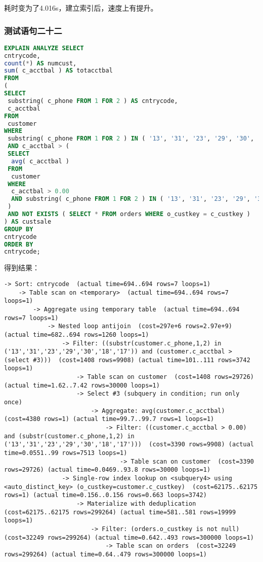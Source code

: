 \documentclass{article}
\begin{document}
耗时变为了4.016s，建立索引后，速度上有提升。

\subsubsection{测试语句二十二}

\begin{lstlisting}[language=sql]
EXPLAIN ANALYZE SELECT
cntrycode,
count(*) AS numcust,
sum( c_acctbal ) AS totacctbal 
FROM
(
SELECT
 substring( c_phone FROM 1 FOR 2 ) AS cntrycode,
 c_acctbal 
FROM
 customer 
WHERE
 substring( c_phone FROM 1 FOR 2 ) IN ( '13', '31', '23', '29', '30', '18', '17' ) 
 AND c_acctbal > (
 SELECT
  avg( c_acctbal ) 
 FROM
  customer 
 WHERE
  c_acctbal > 0.00 
  AND substring( c_phone FROM 1 FOR 2 ) IN ( '13', '31', '23', '29', '30', '18', '17' ) 
 ) 
 AND NOT EXISTS ( SELECT * FROM orders WHERE o_custkey = c_custkey ) 
) AS custsale 
GROUP BY
cntrycode 
ORDER BY
cntrycode;
\end{lstlisting}

得到结果：

\begin{lstlisting}
-> Sort: cntrycode  (actual time=694..694 rows=7 loops=1)
    -> Table scan on <temporary>  (actual time=694..694 rows=7 loops=1)
        -> Aggregate using temporary table  (actual time=694..694 rows=7 loops=1)
            -> Nested loop antijoin  (cost=297e+6 rows=2.97e+9) (actual time=682..694 rows=1260 loops=1)
                -> Filter: ((substr(customer.c_phone,1,2) in ('13','31','23','29','30','18','17')) and (customer.c_acctbal > (select #3)))  (cost=1408 rows=9908) (actual time=101..111 rows=3742 loops=1)
                    -> Table scan on customer  (cost=1408 rows=29726) (actual time=1.62..7.42 rows=30000 loops=1)
                    -> Select #3 (subquery in condition; run only once)
                        -> Aggregate: avg(customer.c_acctbal)  (cost=4380 rows=1) (actual time=99.7..99.7 rows=1 loops=1)
                            -> Filter: ((customer.c_acctbal > 0.00) and (substr(customer.c_phone,1,2) in ('13','31','23','29','30','18','17')))  (cost=3390 rows=9908) (actual time=0.0551..99 rows=7513 loops=1)
                                -> Table scan on customer  (cost=3390 rows=29726) (actual time=0.0469..93.8 rows=30000 loops=1)
                -> Single-row index lookup on <subquery4> using <auto_distinct_key> (o_custkey=customer.c_custkey)  (cost=62175..62175 rows=1) (actual time=0.156..0.156 rows=0.663 loops=3742)
                    -> Materialize with deduplication  (cost=62175..62175 rows=299264) (actual time=581..581 rows=19999 loops=1)
                        -> Filter: (orders.o_custkey is not null)  (cost=32249 rows=299264) (actual time=0.642..493 rows=300000 loops=1)
                            -> Table scan on orders  (cost=32249 rows=299264) (actual time=0.64..479 rows=300000 loops=1)
\end{lstlisting}
\end{document}
